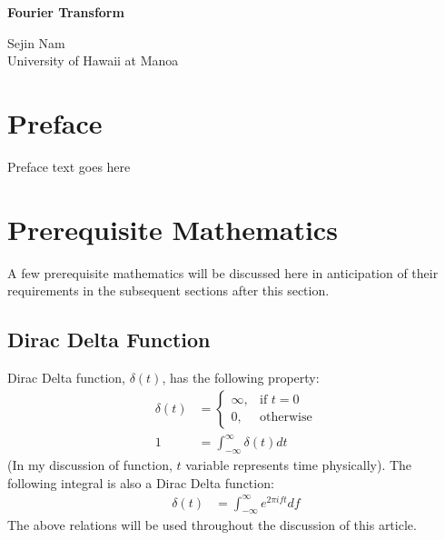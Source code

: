 \documentclass[letterpaper, 11pt]{article}
\newcommand{\fint}{\int_{-\infty}^{\infty}} %
\newcommand{\ift}[2]{\fint #2 e^{2\pi i#1t} d#1} %
\numberwithin{equation}{section}
\begin{document}
\begin{titlepage}
	\begin{center}
		\Huge{\bfseries Fourier Transform}\vfill 
	\end{center}

	\begin{flushright}
		Sejin Nam\\
		University of Hawaii at Manoa
	\end{flushright}
\end{titlepage}

\begin{comment} %
\title{Fourier Transform}
\author{Sejin Nam}
\date{May 20}
\maketitle
\thispagestyle{empty}
\clearpage
\end{comment}

\section*{\centering Preface}
Preface text goes here
\cleardoublepage

\tableofcontents
\clearpage

\pagestyle{fancy}

\section{Prerequisite Mathematics}
A few prerequisite mathematics will be discussed here in anticipation of their requirements in the subsequent sections after this section. 

\subsection{Dirac Delta Function}
Dirac Delta function, \(\delta (t)\), has the following property:
\begin{align}
	\delta (t)	&=\begin{cases}
		\infty, & \text{if } t = 0 \\
		0,	& \text{otherwise}
	\end{cases}\\
		1	&= \fint \delta (t) dt
\end{align}
(In my discussion of function, \(t\) variable represents time physically). The following integral is also a Dirac Delta function:
\begin{align}
	\delta (t)	&= \ift{f}{}\label{eq:dirac}
\end{align}
The above relations will be used throughout the discussion of this article.
\clearpage
\end{document}
